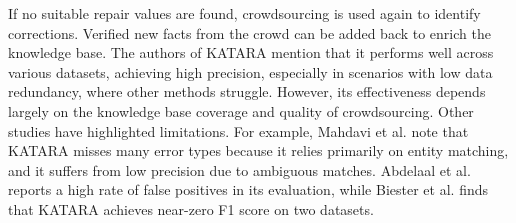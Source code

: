 If no suitable repair values are found, crowdsourcing is used again to identify corrections. 
Verified new facts from the crowd can be added back to enrich the knowledge base. 
The authors of KATARA mention that it performs well across various datasets, achieving high precision, especially in scenarios with low data redundancy, where other methods struggle. 
However, its effectiveness depends largely on the knowledge base coverage and quality of crowdsourcing. 
Other studies have highlighted limitations. 
For example, Mahdavi et al. \cite{RAHA} note that KATARA misses many error types because it relies primarily on entity matching, and it suffers from low precision due to ambiguous matches. 
Abdelaal et al. \cite{REIN} reports a high rate of false positives in its evaluation, while Biester et al. \cite{LLMCLEAN} finds that KATARA achieves near-zero F1 score on two datasets.

